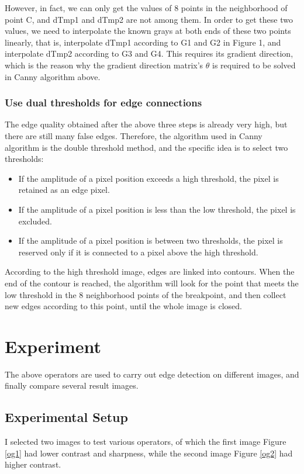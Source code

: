 \documentclass[review]{cvpr}
\begin{document}
However, in fact, we can only get the values of 8 points in the neighborhood of point C, and dTmp1 and dTmp2 are not among them. In order to get these two values, we need to interpolate the known grays at both ends of these two points linearly, that is, interpolate dTmp1 according to G1 and G2 in Figure 1, and interpolate dTmp2 according to G3 and G4. This requires its gradient direction, which is the reason why the gradient direction matrix's $\theta$ is required to be solved in Canny algorithm above.

\subsubsection{Use dual thresholds for edge connections}
The edge quality obtained after the above three steps is already very high, but there are still many false edges. Therefore, the algorithm used in Canny algorithm is the double threshold method, and the specific idea is to select two thresholds:

\begin{itemize}
  \item If the amplitude of a pixel position exceeds a high threshold, the pixel is retained as an edge pixel.
  \item If the amplitude of a pixel position is less than the low threshold, the pixel is excluded.
  \item If the amplitude of a pixel position is between two thresholds, the pixel is reserved only if it is connected to a pixel above the high threshold.
\end{itemize}

According to the high threshold image, edges are linked into contours. When the end of the contour is reached, the algorithm will look for the point that meets the low threshold in the 8 neighborhood points of the breakpoint, and then collect new edges according to this point, until the whole image is closed.

\section{Experiment}
The above operators are used to carry out edge detection on different images, and finally compare several result images.
\subsection{Experimental Setup}
I selected two images to test various operators, of which the first image Figure \ref{og1} had lower contrast and sharpness, while the second image Figure \ref{og2} had higher contrast.
\end{document}
